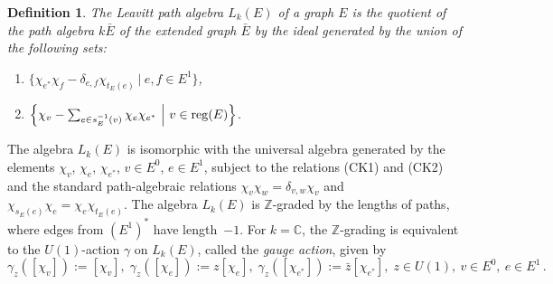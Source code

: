 \documentclass[12pt,times,a4paper]{amsart}
\newtheorem{definition}[theorem]{Definition}
\numberwithin{equation}{section}
\numberwithin{equation}{section}
\begin{document}
\begin{definition}
The {\em Leavitt path algebra} $L_k(E)$ of a graph $E$ is the quotient of the path algebra $k\bar{E}$ of the extended graph 
$\bar{E}$ by the ideal generated by the union of the following sets:
\begin{enumerate}
\item[{\rm (CK1)}] $\{\chi_{e^*}\chi_f-\delta_{e,f}\chi_{t_E(e)}~|~e,f\in E^1\}$,
\item[{\rm (CK2)}] $\Big{\{}\chi_v-\sum_{e\in s^{-1}_E(v)}\chi_e\chi_{e^*}~\Big{|}~v\in{\rm reg}(E)\Big{\}}$.
\end{enumerate}
\end{definition}
\noindent
The algebra $L_k(E)$ is isomorphic with the universal algebra generated by the elements $\chi_v$, $\chi_e$, $\chi_{e^*}$, $v\in E^0$, 
$e\in E^1$, subject to the relations (CK1) and (CK2) and the standard path-algebraic relations $\chi_v\chi_w=\delta_{v,w}\chi_v$ 
and $\chi_{s_E(e)}\chi_e=\chi_e\chi_{t_E(e)}$. The algebra $L_k(E)$ is $\mathbb{Z}$-graded by the lengths of paths, where edges from 
$(E^1)^*$ have length~$-1$. For $k=\mathbb{C}$, the $\mathbb{Z}$-grading is equivalent to the $U(1)$-action $\gamma$ on 
$L_k(E)$, called the {\em gauge action}, 
given by
\begin{equation}\label{algaction}
\gamma_z([\chi_v]):=[\chi_v],\; \gamma_z([\chi_e]):=z[\chi_e],\; \gamma_z([\chi_{e^*}]):=\bar{z}[\chi_{e^*}],
\; z\in U(1),~v\in E^0,~e\in E^1\,.
\end{equation}
\end{document}
